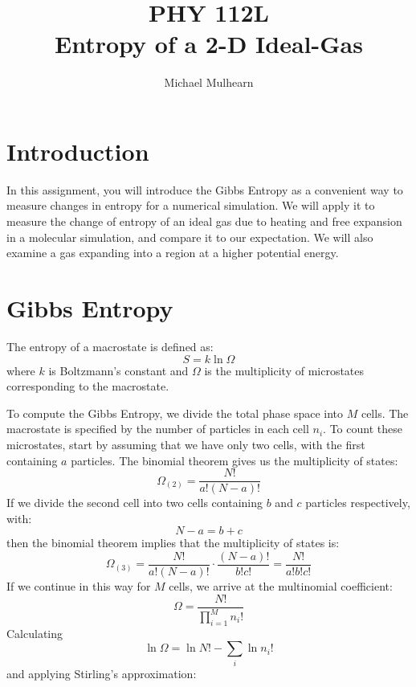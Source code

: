 \documentclass[12pt]{article}
\begin{document}
\title{PHY 112L \\ Entropy of a 2-D Ideal-Gas}
\author{Michael Mulhearn}

\maketitle

\section{Introduction}

In this assignment, you will introduce the Gibbs Entropy as a
convenient way to measure changes in entropy for a numerical
simulation.  We will apply it to measure the change of entropy of an
ideal gas due to heating and free expansion in a molecular simulation,
and compare it to our expectation.  We will also examine a gas
expanding into a region at a higher potential energy.

\section{Gibbs Entropy}

The entropy of a macrostate is defined as:
\begin{equation}
S = k \ln \Omega
\end{equation}
where $k$ is Boltzmann's constant and $\Omega$ is the multiplicity of
microstates corresponding to the macrostate.

To compute the Gibbs Entropy, we divide the total phase space into $M$
cells.  The macrostate is specified by the number of particles in each
cell $n_i$.  To count these microstates, start by assuming that we have
only two cells, with the first containing $a$ particles.  The binomial
theorem gives us the multiplicity of states:
$$\Omega_{(2)} = \frac{N!}{a! (N-a)!}$$
If we divide the second cell into two cells containing $b$ and $c$ particles respectively, with:
$$N-a = b+c$$
then the binomial theorem implies that the multiplicity of states is:
$$\Omega_{(3)} = \frac{N!}{a! (N-a)!} \cdot \frac{(N-a)!}{b! c!} = \frac{N!}{a! b! c!}$$
If we continue in this way for $M$ cells, we arrive at the multinomial coefficient:
\begin{equation}
\Omega = \frac{N!}{\prod_{i=1}^M n_i!}
\end{equation}
Calculating
$$\ln \Omega = \ln N! - \sum_i \ln n_i!$$
and applying Stirling's approximation:
\end{document}
